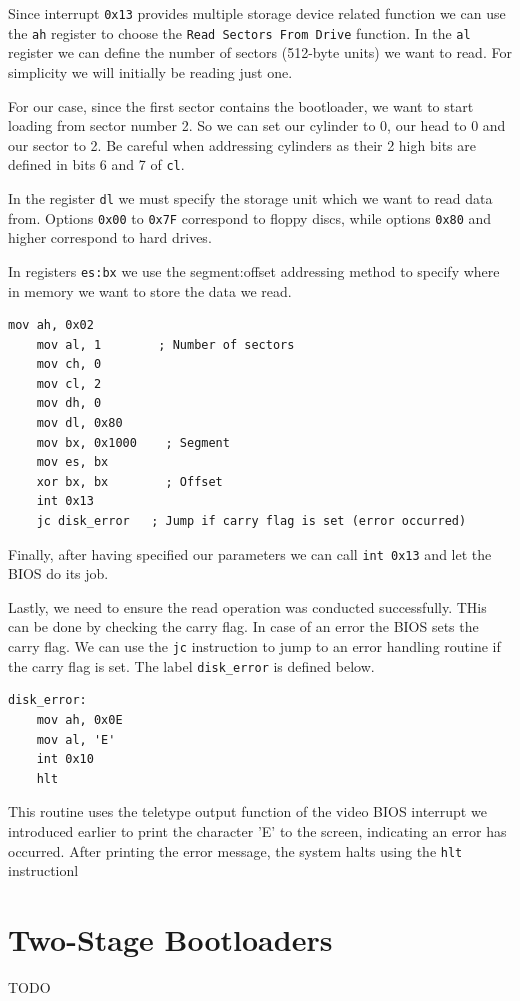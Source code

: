 Since interrupt \texttt{0x13} provides multiple storage device related function we can use the \texttt{ah} register
to choose the \texttt{Read Sectors From Drive} function.
In the \texttt{al} register we can define the number of sectors (512-byte units) we want to read. For simplicity
we will initially be reading just one.

For our case, since the first sector contains the bootloader, we want to start loading from sector number 2.
So we can set our cylinder to 0, our head to 0 and our sector to 2. Be careful when addressing cylinders
as their 2 high bits are defined in bits 6 and 7 of \texttt{cl}.

In the register \texttt{dl} we must specify the storage unit which we want to read data from.
Options \texttt{0x00} to \texttt{0x7F} correspond to floppy discs, while options \texttt{0x80} and higher
correspond to hard drives.

In registers \texttt{es:bx} we use the segment:offset addressing method to specify where in memory we want
to store the data we read.

\begin{lstlisting}[caption={Assembly to load the kernel}]
    mov ah, 0x02
    mov al, 1        ; Number of sectors
    mov ch, 0
    mov cl, 2
    mov dh, 0
    mov dl, 0x80
    mov bx, 0x1000    ; Segment
    mov es, bx
    xor bx, bx        ; Offset
    int 0x13
    jc disk_error   ; Jump if carry flag is set (error occurred)
\end{lstlisting}

Finally, after having specified our parameters we can call \texttt{int 0x13} and let the BIOS do its job.

Lastly, we need to ensure the read operation was conducted successfully. THis can be done by checking the carry flag.
In case of an error the BIOS sets the carry flag. We can use the \texttt{jc} instruction to jump to an error
handling routine if the carry flag is set. The label \texttt{disk\_error} is defined below.

\begin{lstlisting}[caption={Assembly to handle disk read errors}]
disk_error:
    mov ah, 0x0E
    mov al, 'E'
    int 0x10
    hlt
\end{lstlisting}

This routine uses the teletype output function of the video BIOS interrupt we introduced earlier
to print the character 'E' to the screen, indicating an error has occurred. After printing the error message,
the system halts using the \texttt{hlt} instructionl

\section{Two-Stage Bootloaders}

TODO

